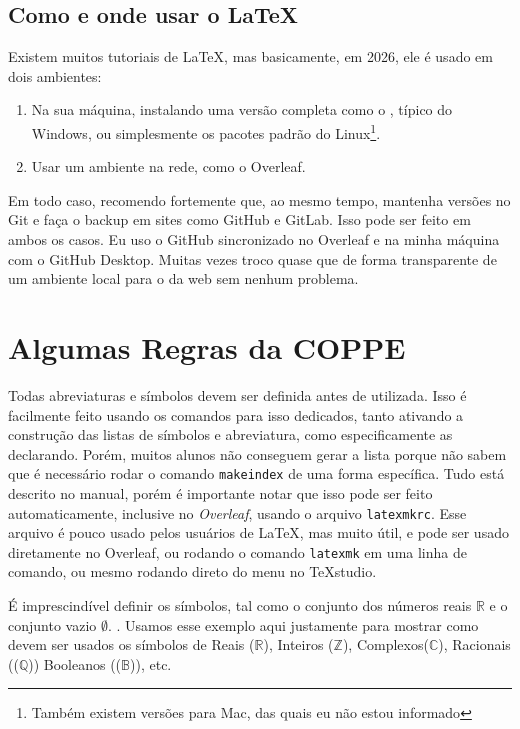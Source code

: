 \documentclass[dsc,setavermelha,numeracaoporcapitulo,linhanafolhaderosto]{ufrj}
\theoremstyle{plain}
\theoremstyle{definition}
\theoremstyle{remark}
\begin{document}
\section{Como e onde usar o \LaTeX}

  Existem muitos tutoriais de \LaTeX, mas basicamente, em 2026, ele é usado em dois ambientes:
  \begin{enumerate}
  \item Na sua máquina, instalando uma versão completa como o , típico do Windows, ou simplesmente os pacotes padrão do Linux\footnote{Também existem versões para Mac, das quais eu não estou informado}.
  \item Usar um ambiente na rede, como o Overleaf.
  \end{enumerate}

  Em todo caso, recomendo fortemente que, ao mesmo tempo, mantenha versões no Git e faça o backup em sites como GitHub e GitLab. Isso pode ser feito em ambos os casos. Eu uso o GitHub sincronizado no Overleaf e na minha máquina com o GitHub Desktop. Muitas vezes troco quase que de forma transparente de um ambiente local para o da web sem nenhum problema.

\chapter{Algumas Regras da COPPE}

  Todas abreviaturas e símbolos devem ser definida antes de utilizada. Isso é facilmente feito usando os comandos para isso dedicados, tanto ativando a construção das listas de símbolos e abreviatura, como especificamente as declarando. Porém, muitos alunos não conseguem gerar a lista porque não sabem que é necessário rodar o comando \verb*|makeindex| de uma forma específica. Tudo está descrito no manual, porém é importante notar que isso pode ser feito automaticamente, inclusive no \textit{Overleaf}, usando o arquivo \verb*|latexmkrc|. Esse arquivo é pouco usado pelos usuários de \LaTeX, mas muito útil, e pode ser usado diretamente no Overleaf, ou rodando o comando \verb|latexmk| em uma linha de comando, ou mesmo rodando direto do menu no TeXstudio.

  É imprescindível definir os símbolos, tal como o
  conjunto dos números reais $\mathbb{R}$ e o conjunto vazio $\emptyset$.
  . Usamos esse exemplo aqui justamente para mostrar como devem ser usados os símbolos de Reais ($\mathbb{R}$), Inteiros ($\mathbb{Z}$), Complexos($\mathbb{C}$), Racionais (($\mathbb{Q}$)) Booleanos (($\mathbb{B}$)), etc.
\end{document}
